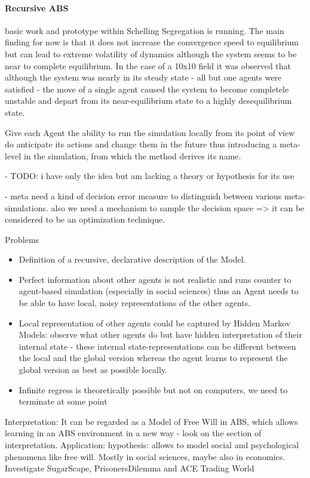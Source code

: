 \paragraph{Recursive ABS}
basic work and prototype within Schelling Segregation is running. The main finding for now is that it does not increase the convergence speed to equilibrium but can lead to extreme volatility of dynamics although the system seems to be near to complete equilibrium. In the case of a 10x10 field it was observed that although the system was nearly in its steady state - all but one agents were satisfied - the move of a single agent caused the system to become completele unstable and depart from its near-equilibrium state to a highly desequilibrium state.

Give each  Agent the ability to run the simulation locally from its point of view do anticipate its actions and change them in the future thus introducing a meta-level in the simulation, from which the method derives its name.

- TODO:  i have only the idea but am lacking a theory or hypothesis for its use

- meta need a kind of decision error measure to distinguish between various meta-simulations. also we need a mechanism to sample the decision space => it can be considered to be an optimization technique.

Problems
\begin{itemize}
	\item Definition of a recursive, declarative description of the Model.
	\item Perfect information about other agents is not realistic and runs counter to agent-based simulation (especially in social sciences) thus an Agent needs to be able to have local, noisy representations of the other agents.
	\item Local representation of other agents could be captured by Hidden Markov Models: observe what other agents do but have hidden interpretation of their internal state - these internal state-representations can be different between the local and the global version whereas the agent learns to represent the global version as best as possible locally.
	\item Infinite regress is theoretically possible but not on computers, we need to terminate at some point
\end{itemize}

Interpretation: It can be regarded as a Model of Free Will in ABS, which allows learning in an ABS environment in a new way - look on the section of interpretation.
Application: hypothesis: allows to model social and psychological phenomena like free will. Mostly in social sciences, maybe also in economics. Investigate SugarScape, PrisonersDilemma and ACE Trading World

